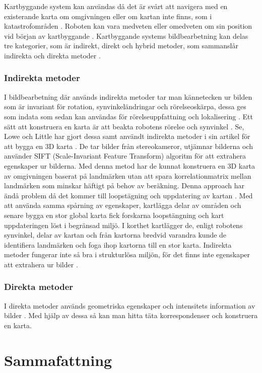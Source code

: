 Kartbyggande system kan användas då det är svårt att navigera med en existerande karta om omgivningen eller om kartan inte finns, som i katastrofområden \citep{geospatial}. Roboten kan vara medveten eller omedveten om sin position vid början av kartbyggande \citep{globalsubmaps}. Kartbyggande systems bildbearbetning kan delas tre kategorier, som är indirekt, direkt och hybrid metoder, som sammanslår indirekta och direkta metoder \citep{geospatial}.

\subsection{Indirekta metoder}

I bildbearbetning där används indirekta metoder tar man kännetecken ur bilden som är invariant för rotation, synvinkeländringar och rörelseoskärpa, dessa ges som indata som sedan kan användas för rörelseuppfattning och lokalisering \citep{geospatial}. Ett sätt att konstruera en karta är att beakta robotens rörelse och synvinkel \citep{globalsubmaps}. Se, Lowe och Little har gjort dessa samt användt indirekta metoder i sin artikel  för att bygga en 3D karta \citep{mapbuildingsift}. De tar bilder från stereokameror, utjämnar bilderna och använder SIFT (Scale-Invariant Feature Transform) algoritm för att extrahera egenskaper ur bilderna. Med denna metod har de kunnat konstruera en 3D karta av omgivningen baserat på landmärken utan att spara korrelationmatrix mellan landmärken som minskar häftigt på behov av beräkning. Denna approach har ändå problem då det kommer till loopstägning och uppdatering av kartan \citep{globalsubmaps}. Med att använda samma spårning av egenskaper, kartlägga delar av områden och senare bygga en stor global karta fick forskarna loopstängning och kart uppdateringen löst i begränsad miljö. I korthet kartlägger de, enligt robotens synvinkel, delar av kartan och från kartorna bredvid varandra kunde de identifiera landmärken och foga ihop kartorna till en stor karta. Indirekta metoder fungerar inte så bra i strukturlösa miljön, för det finns inte egenskaper att extrahera ur bilder \citep{geospatial}.

\subsection{Direkta metoder}

I direkta metoder används geometriska egenskaper och intensitets information av bilder \citep{geospatial}. Med hjälp av dessa så kan man hitta täta korrespondenser och konstruera en karta. 

\chapter{Sammafattning}

\iffalse
Mäst är inomhus av drönaren
Problem med beräkning, pga batteri kapacitet och komplexa algoritmer och bildbearbetningsalgoritmer
6DoF globalsubmaps
\fi

